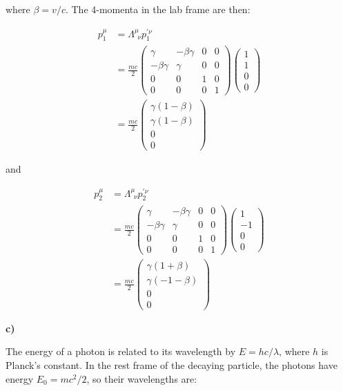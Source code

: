 \documentclass{article}
\begin{document}
where $\beta = v/c$.  The 4-momenta in the lab frame are then:

\begin{align*}
p_1^\mu &= \Lambda^\mu_{\ \ \nu} p_1^{\prime \nu} \\
&= \frac{mc}{2} \begin{pmatrix} \gamma & -\beta \gamma & 0 & 0 \\ -\beta \gamma & \gamma & 0 & 0 \\ 0 & 0 & 1 & 0 \\ 0 & 0 & 0 & 1 \end{pmatrix} \begin{pmatrix} 1 \\ 1 \\ 0 \\ 0 \end{pmatrix} \\
&= \frac{mc}{2} \begin{pmatrix} \gamma (1 - \beta) \\ \gamma (1 - \beta) \\ 0 \\ 0 \end{pmatrix}
\end{align*}

and

\begin{align*}
p_2^\mu &= \Lambda^\mu_{\ \ \nu} p_2^{\prime \nu} \\
&= \frac{mc}{2} \begin{pmatrix} \gamma & -\beta \gamma & 0 & 0 \\ -\beta \gamma & \gamma & 0 & 0 \\ 0 & 0 & 1 & 0 \\ 0 & 0 & 0 & 1 \end{pmatrix} \begin{pmatrix} 1 \\ -1 \\ 0 \\ 0 \end{pmatrix} \\
&= \frac{mc}{2} \begin{pmatrix} \gamma (1 + \beta) \\ \gamma (-1 - \beta) \\ 0 \\ 0 \end{pmatrix}
\end{align*}

\textbf{c)}

The energy of a photon is related to its wavelength by $E = hc/\lambda$, where $h$ is Planck's constant.  In the rest frame of the decaying particle, the photons have energy $E_0 = mc^2/2$, so their wavelengths are:
\end{document}
